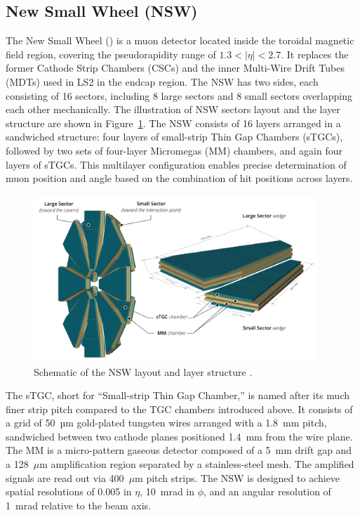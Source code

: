 \subsection{New Small Wheel (NSW)}
The New Small Wheel (\NSW) is a muon detector located inside the toroidal magnetic field region, covering the pseudorapidity range of $1.3 < |\eta| < 2.7$. It replaces the former Cathode Strip Chambers (CSCs) and the inner Multi-Wire Drift Tubes (MDTs) used in LS2 in the endcap region. The NSW has two sides, each consisting of 16 sectors, including 8 large sectors and 8 small sectors overlapping each other mechanically. The illustration of NSW sectors layout and the layer structure are shown in Figure~\ref{fig:NSW}. The NSW consists of 16 layers arranged in a sandwiched structure: four layers of small-strip Thin Gap Chambers (sTGCs), followed by two sets of four-layer Micromegas (MM) chambers, and again four layers of sTGCs. This multilayer configuration enables precise determination of muon position and angle based on the combination of hit positions across layers.

\begin{figure}[htbp]
  \centering
  \includegraphics[width=0.95\textwidth]{figs/chapter2/NSW.png}
  \caption{Schematic of the NSW layout and layer structure \cite{ATLASRun3Detector}.}
  \label{fig:NSW}
\end{figure}

The sTGC, short for “Small-strip Thin Gap Chamber,” is named after its much finer strip pitch compared to the TGC chambers introduced above. It consists of a grid of 50~µm gold-plated tungsten wires arranged with a 1.8~mm pitch, sandwiched between two cathode planes positioned 1.4~mm from the wire plane. The MM is a micro-pattern gaseous detector composed of a 5~mm drift gap and a 128~$\mu$m amplification region separated by a stainless-steel mesh. The amplified signals are read out via 400~$\mu$m pitch strips. The NSW is designed to achieve spatial resolutions of 0.005 in $\eta$, 10~mrad in $\phi$, and an angular resolution of 1~mrad relative to the beam axis.

